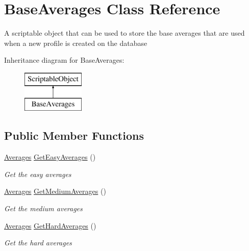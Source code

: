 \hypertarget{class_base_averages}{}\section{Base\+Averages Class Reference}
\label{class_base_averages}


A scriptable object that can be used to store the base averages that are used when a new profile is created on the database  


Inheritance diagram for Base\+Averages\+:\begin{figure}[H]
\begin{center}
\leavevmode
\includegraphics[height=2.000000cm]{class_base_averages}
\end{center}
\end{figure}
\subsection*{Public Member Functions}
\begin{DoxyCompactItemize}
\item 
\mbox{\hyperlink{struct_level_generation_1_1_averages}{Averages}} \mbox{\hyperlink{class_base_averages_af137b781aca1054548d1a04cdb7b2d16}{Get\+Easy\+Averages}} ()
\begin{DoxyCompactList}\small\item\em Get the easy averages \end{DoxyCompactList}\item 
\mbox{\hyperlink{struct_level_generation_1_1_averages}{Averages}} \mbox{\hyperlink{class_base_averages_a1eebd8734dbf18c96295bd93589bcd94}{Get\+Medium\+Averages}} ()
\begin{DoxyCompactList}\small\item\em Get the medium averages \end{DoxyCompactList}\item 
\mbox{\hyperlink{struct_level_generation_1_1_averages}{Averages}} \mbox{\hyperlink{class_base_averages_a5f0bafc5282ea7b0c4842efbe5d077af}{Get\+Hard\+Averages}} ()
\begin{DoxyCompactList}\small\item\em Get the hard averages \end{DoxyCompactList}\end{DoxyCompactItemize}


